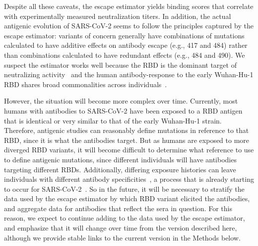\documentclass[9pt,twocolumn,twoside]{gsajnl_modified}
\begin{document}
Despite all these caveats, the escape estimator yields binding scores that correlate with experimentally measured neutralization titers.
In addition, the actual antigenic evolution of SARS-CoV-2 seems to follow the principles captured by the escape estimator: variants of concern generally have combinations of mutations calculated to have additive effects on antibody escape (e.g., 417 and 484) rather than combinations calculated to have redundant effects (e.g., 484 and 490).
We suspect the estimator works well because the RBD is the dominant target of neutralizing activity~\citep{piccoli2020mapping,greaney2021comprehensive,schmidt2021high} and the human antibody-response to the early Wuhan-Hu-1 RBD shares broad commonalities across individuals~\citep{yuan2020structural,robbiani2020convergent,greaney2021comprehensive,greaney2021mapping,chen2021convergent}.

However, the situation will become more complex over time.
Currently, most humans with antibodies to SARS-CoV-2 have been exposed to a RBD antigen that is identical or very similar to that of the early Wuhan-Hu-1 strain.
Therefore, antigenic studies can reasonably define mutations in reference to that RBD, since it is what the antibodies target.
But as humans are exposed to more diverged RBD variants, it will become difficult to determine what reference to use to define antigenic mutations, since different individuals will have antibodies targeting different RBDs.
Additionally, differing exposure histories can leave individuals with different antibody specificities~\citep{cobey2017immune}, a process that is already starting to occur for SARS-CoV-2~\citep{greaney2021sars}.
So in the future, it will be necessary to stratify the data used by the escape estimator by which RBD variant elicited the antibodies, and aggregate data for antibodies that reflect the sera in question.
For this reason, we expect to continue adding to the data used by the escape estimator, and emphasize that it will change over time from the version described here, although we provide stable links to the current version in the Methods below. 
\end{document}

